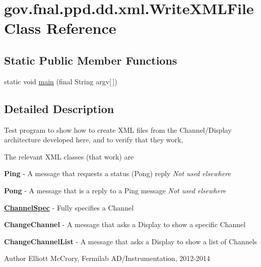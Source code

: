 \hypertarget{classgov_1_1fnal_1_1ppd_1_1dd_1_1xml_1_1WriteXMLFile}{\section{gov.\-fnal.\-ppd.\-dd.\-xml.\-Write\-X\-M\-L\-File Class Reference}
\label{classgov_1_1fnal_1_1ppd_1_1dd_1_1xml_1_1WriteXMLFile}
}
\subsection*{Static Public Member Functions}
\begin{DoxyCompactItemize}
\item 
static void \hyperlink{classgov_1_1fnal_1_1ppd_1_1dd_1_1xml_1_1WriteXMLFile_a5cc794a07a8e62fec4291fac882ec9ca}{main} (final String argv\mbox{[}$\,$\mbox{]})
\end{DoxyCompactItemize}


\subsection{Detailed Description}
Test program to show how to create X\-M\-L files from the Channel/\-Display architecture developed here, and to verify that they work, 

The relevant X\-M\-L classes (that work) are 
\begin{DoxyItemize}
\item {\bfseries Ping} -\/ A message that requests a status (Pong) reply {\itshape Not used elsewhere} 
\item {\bfseries Pong} -\/ A message that is a reply to a Ping message {\itshape Not used elsewhere} 
\item {\bfseries \hyperlink{classgov_1_1fnal_1_1ppd_1_1dd_1_1xml_1_1ChannelSpec}{Channel\-Spec}} -\/ Fully specifies a Channel 
\item {\bfseries Change\-Channel} -\/ A message that asks a Display to show a specific Channel 
\item {\bfseries Change\-Channel\-List} -\/ A message that asks a Display to show a list of Channels 
\end{DoxyItemize}

\begin{DoxyAuthor}{Author}
Elliott Mc\-Crory, Fermilab A\-D/\-Instrumentation, 2012-\/2014 
\end{DoxyAuthor}


